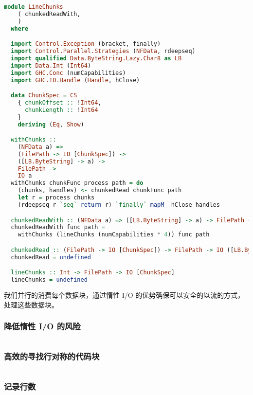 \documentclass[./main.tex]{subfiles}
\begin{document}
\begin{lstlisting}[language=Haskell]
  module LineChunks
    ( chunkedReadWith,
    )
  where

  import Control.Exception (bracket, finally)
  import Control.Parallel.Strategies (NFData, rdeepseq)
  import qualified Data.ByteString.Lazy.Char8 as LB
  import Data.Int (Int64)
  import GHC.Conc (numCapabilities)
  import GHC.IO.Handle (Handle, hClose)

  data ChunkSpec = CS
    { chunkOffset :: !Int64,
      chunkLength :: !Int64
    }
    deriving (Eq, Show)

  withChunks ::
    (NFData a) =>
    (FilePath -> IO [ChunkSpec]) ->
    ([LB.ByteString] -> a) ->
    FilePath ->
    IO a
  withChunks chunkFunc process path = do
    (chunks, handles) <- chunkedRead chunkFunc path
    let r = process chunks
    (rdeepseq r `seq` return r) `finally` mapM_ hClose handles

  chunkedReadWith :: (NFData a) => ([LB.ByteString] -> a) -> FilePath -> IO a
  chunkedReadWith func path =
    withChunks (lineChunks (numCapabilities * 4)) func path

  chunkedRead :: (FilePath -> IO [ChunkSpec]) -> FilePath -> IO ([LB.ByteString], [Handle])
  chunkedRead = undefined

  lineChunks :: Int -> FilePath -> IO [ChunkSpec]
  lineChunks = undefined
\end{lstlisting}

我们并行的消费每个数据块，通过惰性 I/O 的优势确保可以安全的以流的方式，处理这些数据块。

\subsubsection*{降低惰性 I/O 的风险}

%

\begin{lstlisting}[language=Haskell]

\end{lstlisting}

\subsubsection*{高效的寻找行对称的代码块}


\begin{lstlisting}[language=Haskell]

\end{lstlisting}

\subsubsection*{记录行数}
\end{document}
